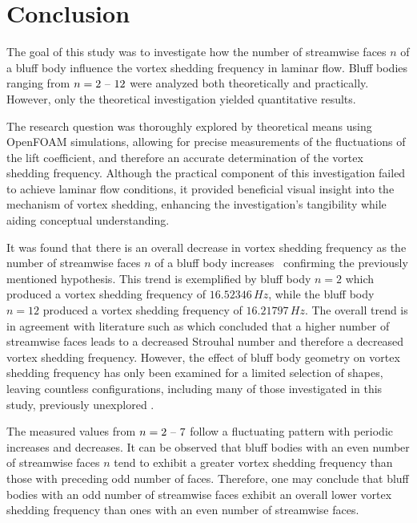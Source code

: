\section{Conclusion}
\label{sec:conclusion}
The goal of this study was to investigate how the number of streamwise faces $n$ of a bluff body influence the vortex shedding frequency in laminar flow. Bluff bodies ranging from $n = 2 \text{ \textendash\ } 12$ were analyzed both theoretically and practically. However, only the theoretical investigation yielded quantitative results.

The research question was thoroughly explored by theoretical means using OpenFOAM simulations, allowing for precise measurements of the fluctuations of the lift coefficient, and therefore an accurate determination of the vortex shedding frequency. Although the practical component of this investigation failed to achieve laminar flow conditions, it provided beneficial visual insight into the mechanism of vortex shedding, enhancing the investigation's tangibility while aiding conceptual understanding.

It was found that there is an overall decrease in vortex shedding frequency as the number of streamwise faces $n$ of a bluff body increases \textemdash\ confirming the previously mentioned hypothesis. This trend is exemplified by bluff body $n = 2$ which produced a vortex shedding frequency of $16.52346\, Hz$, while the bluff body $n = 12$ produced a vortex shedding frequency of $16.21797\, Hz$. The overall trend is in agreement with literature such as \textcite{goncalves1999strouhal} which concluded that a higher number of streamwise faces leads to a decreased Strouhal number and therefore a decreased vortex shedding frequency. However, the effect of bluff body geometry on vortex shedding frequency has only been examined for a limited selection of shapes, leaving countless configurations, including many of those investigated in this study, previously unexplored \parencite[22]{city7565}.

The measured values from $n = 2 \text{ \textendash\ } 7$ follow a fluctuating pattern with periodic increases and decreases. It can be observed that bluff bodies with an even number of streamwise faces $n$ tend to exhibit a greater vortex shedding frequency than those with preceding odd number of faces. Therefore, one may conclude that bluff bodies with an odd number of streamwise faces exhibit an overall lower vortex shedding frequency than ones with an even number of streamwise faces.

